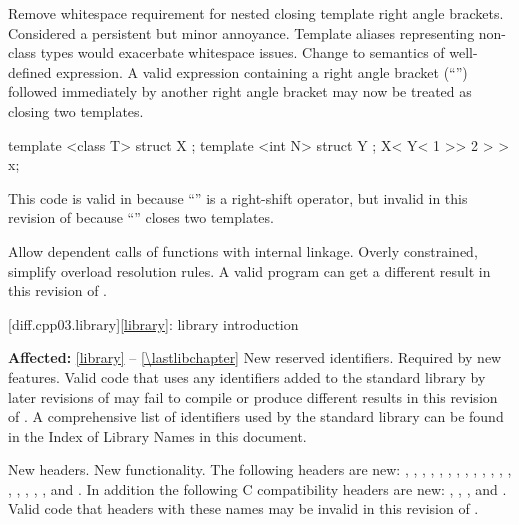\change
Remove whitespace requirement for nested closing template right angle
brackets.
\rationale
Considered a persistent but minor annoyance. Template aliases
representing non-class types would exacerbate whitespace issues.
\effect
Change to semantics of well-defined expression. A valid \CppIII{} expression
containing a right angle bracket (``\tcode{>}'') followed immediately by
another right angle bracket may now be treated as closing two templates.
\begin{example}
\begin{codeblock}
template <class T> struct X { };
template <int N> struct Y { };
X< Y< 1 >> 2 > > x;
\end{codeblock}
This code is valid in \CppIII{} because ``\tcode{>>}''
is a right-shift operator, but invalid in this revision of \Cpp{} because
``\tcode{>>}'' closes two templates.
\end{example}

\change
Allow dependent calls of functions with internal linkage.
\rationale
Overly constrained, simplify overload resolution rules.
\effect
A valid \CppIII{} program can get a different result in this
revision of \Cpp{}.

[diff.cpp03.library]{\ref{library}: library introduction}

\pnum
\textbf{Affected:} \ref{library} -- \ref{\lastlibchapter}
\change
New reserved identifiers.
\rationale
Required by new features.
\effect
Valid \CppIII{} code that uses any identifiers added to the \Cpp{} standard
library by later revisions of \Cpp{} may fail to compile or produce different
results in this revision of \Cpp{}. A comprehensive list of identifiers used
by the \Cpp{} standard library can be found in the Index of Library Names in this
document.

\change
New headers.
\rationale
New functionality.
\effect
The following \Cpp{} headers are new:
,
,
,
,
,
,
,
,
,
,
,
,
,
,
,
,
,
,
and
.
In addition the following C compatibility headers are new:
,
,
,
and
.
Valid \CppIII{} code that  headers with these names may be
invalid in this revision of \Cpp{}.

